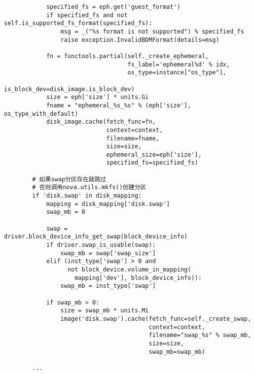 \documentclass[a4paper,left=1.5cm,right=1.5cm,11pt]{article}
\begin{document}
\begin{lstlisting}
            specified_fs = eph.get('guest_format')
            if specified_fs and not self.is_supported_fs_format(specified_fs):
                msg = _("%s format is not supported") % specified_fs
                raise exception.InvalidBDMFormat(details=msg)

            fn = functools.partial(self._create_ephemeral,
                                   fs_label='ephemeral%d' % idx,
                                   os_type=instance["os_type"],
                                   is_block_dev=disk_image.is_block_dev)
            size = eph['size'] * units.Gi
            fname = "ephemeral_%s_%s" % (eph['size'], os_type_with_default)
            disk_image.cache(fetch_func=fn,
                             context=context,
                             filename=fname,
                             size=size,
                             ephemeral_size=eph['size'],
                             specified_fs=specified_fs)
		
		# 如果swap分区存在就跳过
		# 否则调用nova.utils.mkfs()创建分区
        if 'disk.swap' in disk_mapping:
            mapping = disk_mapping['disk.swap']
            swap_mb = 0

            swap = driver.block_device_info_get_swap(block_device_info)
            if driver.swap_is_usable(swap):
                swap_mb = swap['swap_size']
            elif (inst_type['swap'] > 0 and
                  not block_device.volume_in_mapping(
                    mapping['dev'], block_device_info)):
                swap_mb = inst_type['swap']

            if swap_mb > 0:
                size = swap_mb * units.Mi
                image('disk.swap').cache(fetch_func=self._create_swap,
                                         context=context,
                                         filename="swap_%s" % swap_mb,
                                         size=size,
                                         swap_mb=swap_mb)

        ...
	\end{lstlisting}

\clearpage
\end{document}
